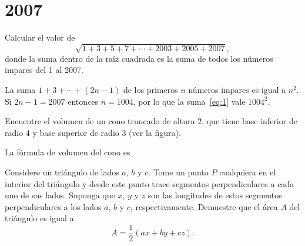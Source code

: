 \chapter{2007}
\label{cha:2007}

\begin{Problema}{1}
  Calcular el valor de
  \begin{equation}
    \label{eq:1}
    \sqrt{1+3+5+7+\cdots+2003+2005+2007},
  \end{equation}
  donde la suma dentro de la ra\'iz cuadrada es la suma de todos los
  n\'umeros impares del 1 al 2007.
\end{Problema}

\begin{Solucion}
  La suma $1+3+\cdots+(2n-1)$ de los primeros $n$ n\'umeros impares es
  igual a $n^{2}$. Si $2n-1=2007$ entonces $n=1004$, por lo que la
  suma~\ref{eq:1} vale $1004^{2}$.
\end{Solucion}

\begin{Problema}{2}
  Encuentre el volumen de un cono truncado de altura $2$, que tiene
  base inferior de radio $4$ y base superior de radio $3$ (ver la
  figura).
\end{Problema}

\begin{Solucion}
  La f\'ormula de volumen del cono es   
\end{Solucion}

\begin{Problema}{3}
  Considere un tri\'angulo de lados $a$, $b$ y $c$. Tome un punto $P$
  cualquiera en el interior del tri\'angulo y desde este punto trace
  segmentos perpendiculares a cada uno de sus lados. Suponga que $x$,
  $y$ y $z$ son las longitudes de estos segmentos perpendiculares a
  los lados $a$, $b$ y $c$, respectivamente. Demuestre que el \'area
  $A$ del tri\'angulo es igual a
  \begin{equation}
    \label{eq:2}
    A=\frac{1}{2}( ax+by+cz). 
  \end{equation}
\end{Problema}

\begin{Solucion}
  
\end{Solucion}

